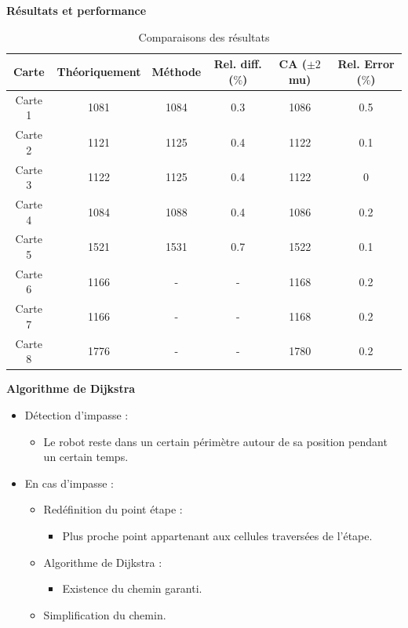 \documentclass[aspectratio=169,10pt]{beamer}
\begin{document}
\begin{frame}{\textbf{Résultats et performance}}
    \begin{table}[H]
		\centering
		\begin{tabular}{c c c c c c}
			\hline
			Carte & Théoriquement & Méthode & Rel. diff. ($\%$) & CA ($\pm 2$ mu) & Rel. Error ($\%$)\\
			\hline
			Carte 1 & 1081 & 1084 & 0.3 & 1086 & 0.5\\
			Carte 2 & 1121 & 1125 & 0.4 & 1122 & 0.1\\
			Carte 3 & 1122 & 1125 & 0.4 & 1122 & 0\\
			Carte 4 & 1084 & 1088 & 0.4 & 1086 & 0.2\\
			Carte 5 & 1521 & 1531 & 0.7 & 1522 & 0.1\\
			Carte 6 & 1166 & - & - & 1168 & 0.2\\
			Carte 7 & 1166 & - & - & 1168 & 0.2\\
			Carte 8 & 1776 & - & - & 1780 & 0.2\\
			\hline
		\end{tabular}
		\caption{Comparaisons des résultats}
		\label{tab:benchmark_results}
	\end{table}
\end{frame}

\begin{frame}{\textbf{Algorithme de Dijkstra}}
	\begin{itemize}
		\item Détection d'impasse :
		\vspace{0.2cm}
		\begin{itemize}
			\item Le robot reste dans un certain périmètre autour de sa position pendant un certain temps.
		\end{itemize}
		\vspace{0.2cm}
		\item En cas d'impasse :
		\vspace{0.2cm}
		\begin{itemize}
			\item Redéfinition du point étape :
			\vspace{0.2cm}
			\begin{itemize}
				\item Plus proche point appartenant aux cellules traversées de l'étape.
			\end{itemize}
			\vspace{0.2cm}
			\item Algorithme de Dijkstra :
			\vspace{0.2cm}
			\begin{itemize}
				\item Existence du chemin garanti.
			\end{itemize}
			\vspace{0.2cm}
			\item Simplification du chemin.
		\end{itemize}
	\end{itemize}

\end{frame}
\end{document}
